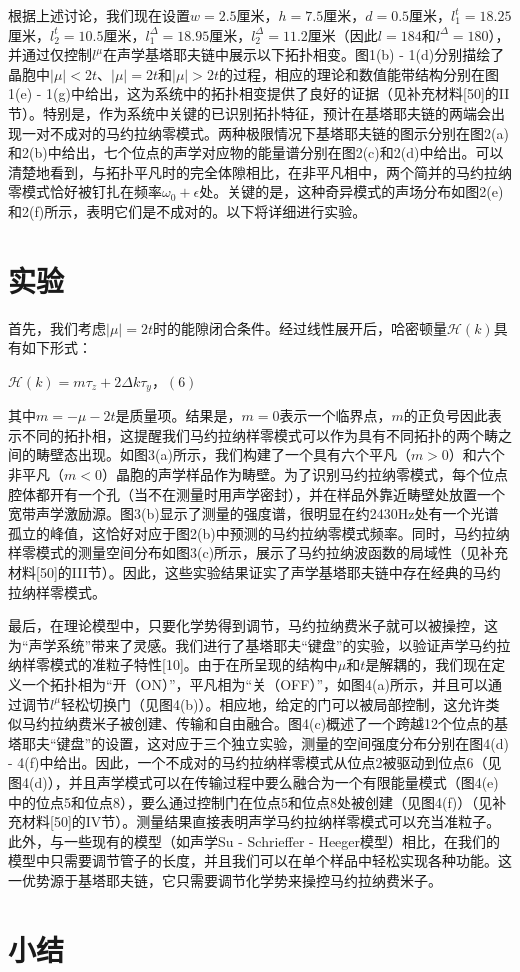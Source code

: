 根据上述讨论，我们现在设置\(w = 2.5\)厘米，\(h = 7.5\)厘米，\(d = 0.5\)厘米，\(l_{1}^{t} = 18.25\)厘米，\(l_{2}^{t} = 10.5\)厘米，\(l_{1}^{\Delta} = 18.95\)厘米，\(l_{2}^{\Delta} = 11.2\)厘米（因此\(l = 184\)和\(l^{\Delta} = 180\)），并通过仅控制\(l^{\mu}\)在声学基塔耶夫链中展示以下拓扑相变。图1(b) - 1(d)分别描绘了晶胞中\(\vert \mu \vert < 2t\)、\(\vert \mu \vert = 2t\)和\(\vert \mu \vert > 2t\)的过程，相应的理论和数值能带结构分别在图1(e) - 1(g)中给出，这为系统中的拓扑相变提供了良好的证据（见补充材料[50]的II节）。特别是，作为系统中关键的已识别拓扑特征，预计在基塔耶夫链的两端会出现一对不成对的马约拉纳零模式。两种极限情况下基塔耶夫链的图示分别在图2(a)和2(b)中给出，七个位点的声学对应物的能量谱分别在图2(c)和2(d)中给出。可以清楚地看到，与拓扑平凡时的完全体隙相比，在非平凡相中，两个简并的马约拉纳零模式恰好被钉扎在频率\(\omega_{0} + \epsilon\)处。关键的是，这种奇异模式的声场分布如图2(e)和2(f)所示，表明它们是不成对的。以下将详细进行实验。

\section{实验}

首先，我们考虑\(\vert \mu \vert = 2t\)时的能隙闭合条件。经过线性展开后，哈密顿量\(\mathcal{H}(k)\)具有如下形式：

\(\mathcal{H}(k) = m\tau_{z} + 2\Delta k\tau_{y}\)，\((6)\)

其中\(m = -\mu - 2t\)是质量项。结果是，\(m = 0\)表示一个临界点，\(m\)的正负号因此表示不同的拓扑相，这提醒我们马约拉纳样零模式可以作为具有不同拓扑的两个畴之间的畴壁态出现。如图3(a)所示，我们构建了一个具有六个平凡（\(m > 0\)）和六个非平凡（\(m < 0\)）晶胞的声学样品作为畴壁。为了识别马约拉纳零模式，每个位点腔体都开有一个孔（当不在测量时用声学密封），并在样品外靠近畴壁处放置一个宽带声学激励源。图3(b)显示了测量的强度谱，很明显在约2430Hz处有一个光谱孤立的峰值，这恰好对应于图2(b)中预测的马约拉纳零模式频率。同时，马约拉纳样零模式的测量空间分布如图3(c)所示，展示了马约拉纳波函数的局域性（见补充材料[50]的III节）。因此，这些实验结果证实了声学基塔耶夫链中存在经典的马约拉纳样零模式。

最后，在理论模型中，只要化学势得到调节，马约拉纳费米子就可以被操控，这为“声学系统”带来了灵感。我们进行了基塔耶夫“键盘”的实验，以验证声学马约拉纳样零模式的准粒子特性[10]。由于在所呈现的结构中\(\mu\)和\(t\)是解耦的，我们现在定义一个拓扑相为“开（ON）”，平凡相为“关（OFF）”，如图4(a)所示，并且可以通过调节\(l^{\mu}\)轻松切换门（见图4(b)）。相应地，给定的门可以被局部控制，这允许类似马约拉纳费米子被创建、传输和自由融合。图4(c)概述了一个跨越12个位点的基塔耶夫“键盘”的设置，这对应于三个独立实验，测量的空间强度分布分别在图4(d) - 4(f)中给出。因此，一个不成对的马约拉纳样零模式从位点2被驱动到位点6（见图4(d)），并且声学模式可以在传输过程中要么融合为一个有限能量模式（图4(e)中的位点5和位点8），要么通过控制门在位点5和位点8处被创建（见图4(f)）（见补充材料[50]的IV节）。测量结果直接表明声学马约拉纳样零模式可以充当准粒子。此外，与一些现有的模型（如声学Su - Schrieffer - Heeger模型）相比，在我们的模型中只需要调节管子的长度，并且我们可以在单个样品中轻松实现各种功能。这一优势源于基塔耶夫链，它只需要调节化学势来操控马约拉纳费米子。

\section{小结}